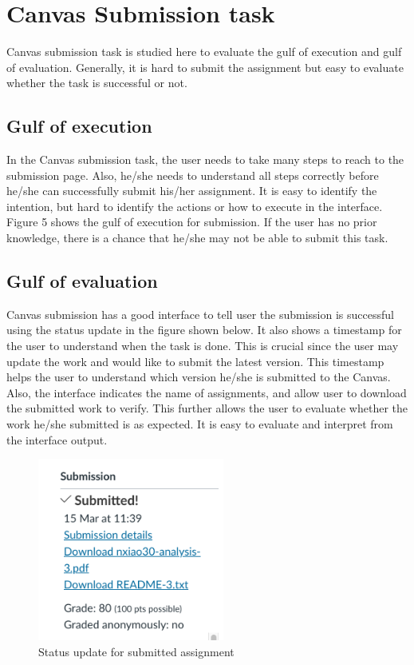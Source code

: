 \documentclass[
	letterpaper, %
]{jdf}
\begin{document}
\section{Canvas Submission task}
Canvas submission task is studied here to evaluate the gulf of execution and gulf of evaluation. Generally, it is hard to submit the assignment but easy to evaluate whether the task is successful or not.

\subsection{Gulf of execution}
In the Canvas submission task, the user needs to take many steps to reach to the submission page. Also, he/she needs to understand all steps correctly before he/she can successfully submit his/her assignment. It is easy to identify the intention, but hard to identify the actions or how to execute in the interface. Figure 5 shows the gulf of execution for submission. If the user has no prior knowledge, there is a chance that he/she may not be able to submit this task.

\subsection{Gulf of evaluation}
Canvas submission has a good interface to tell user the submission is successful using the status update in the figure shown below. It also shows a timestamp for the user to understand when the task is done. This is crucial since the user may update the work and would like to submit the latest version. This timestamp helps the user to understand which version he/she is submitted to the Canvas. Also, the interface indicates the name of assignments, and allow user to download the submitted work to verify. This further allows the user to evaluate whether the work he/she submitted is as expected. It is easy to evaluate and interpret from the interface output.

\begin{figure}[h]
	\centering
	\includegraphics[height=6cm]{Figures/canvas_submit_eval.png}
	\caption{Status update for submitted assignment}
	\label{fig:canvas_submit_eval}
\end{figure}
\end{document}
